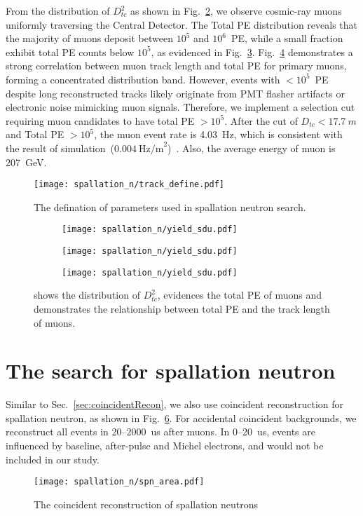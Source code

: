 From the distribution of $D_{tc}^2$ as shown in Fig.~\ref{fig:dfcc}, we observe cosmic-ray muons uniformly traversing the Central Detector. The Total PE distribution reveals that the majority of muons deposit between $10^5$ and $10^6$~\si{PE}, while a small fraction exhibit total PE counts below $10^5$, as evidenced in Fig.~\ref{fig:pe}. Fig.~\ref{fig:track-pe} demonstrates a strong correlation between muon track length and total PE for primary muons, forming a concentrated distribution band. However, events with $<10^5$~PE despite long reconstructed tracks likely originate from PMT flasher artifacts or electronic noise mimicking muon signals. Therefore, we implement a selection cut requiring muon candidates to have total PE $>10^5$. After the cut of $D_{tc}<\SI{17.7}{m}$ and Total PE $>10^5$, the muon event rate is \SI{4.03}{Hz}, which is consistent with the result of simulation~($0.004~\text{Hz/m}^2$)~\cite{muon207}. Also, the average energy of muon is \SI{207}{GeV}.
\begin{figure}[h]
	\centering
	\texttt{[image: spallation\_n/track\_define.pdf]}
	\caption{The defination of parameters used in spallation neutron search.}
	\label{fig:muonTrackDef}
\end{figure}


\begin{figure}[h]
	\centering
	\begin{subfigure}{0.5\textwidth}
		\centering
		\texttt{[image: spallation\_n/yield\_sdu.pdf]}
		\caption{}
		\label{fig:dfcc}
	\end{subfigure}%
	\begin{subfigure}{0.5\textwidth}
		\centering
		\texttt{[image: spallation\_n/yield\_sdu.pdf]}
		\caption{}
		\label{fig:pe}
	\end{subfigure}
	\begin{subfigure}{0.5\textwidth}
		\centering
		\texttt{[image: spallation\_n/yield\_sdu.pdf]}
		\caption{}
		\label{fig:track-pe}
	\end{subfigure}
	\caption{ shows the distribution of $D_{tc}^2$,  evidences the total PE of muons and  demonstrates the relationship between total PE and the track length of muons.}
	\label{fig:MuonInfo}
\end{figure}

\section{The search for spallation neutron}
Similar to Sec.~\ref{sec:coincidentRecon}, we also use coincident reconstruction for spallation neutron, as shown in Fig.~\ref{fig:coinRecSPN}. For accidental coincident backgrounds, we reconstruct all events in 20--\SI{2000}{us} after muons. In 0--\SI{20}{us}, events are influenced by baseline, after-pulse and Michel electrons, and would not be included in our study.
\begin{figure}[h]
	\centering
	\texttt{[image: spallation\_n/spn\_area.pdf]}
	\caption{The coincident reconstruction of spallation neutrons}
	\label{fig:coinRecSPN}
\end{figure}

